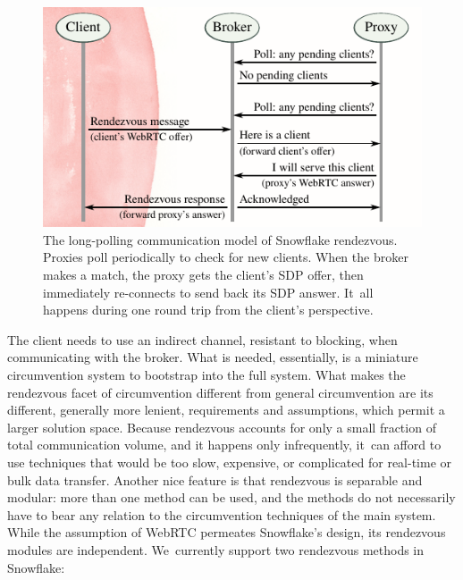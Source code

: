 \documentclass[letterpaper,twocolumn]{article}
\begin{document}
\begin{figure}
\includegraphics{figures/rendezvous/rendezvous}
\caption{
The long-polling communication model of Snowflake rendezvous.
Proxies poll periodically to check for new clients.
When the broker makes a match,
the proxy gets the client's SDP offer,
then immediately re-connects to send back its SDP answer.
It~all happens during one round trip from the client's perspective.
}
\label{fig:rendezvous}
\end{figure}

The client needs to use an indirect channel,
resistant to blocking,
when communicating with the broker.
What is needed, essentially,
is a miniature circumvention system
to bootstrap into the full system.
What makes the rendezvous facet of circumvention
different from general circumvention
are its different, generally more lenient, requirements and assumptions,
which permit a larger solution space.
Because rendezvous accounts for only a small fraction
of total communication volume,
and it happens only infrequently,
it~can afford to use techniques that would be
too slow, expensive, or complicated
for real-time or bulk data transfer.
Another nice feature is that rendezvous is separable and modular:
more than one method can be used,
and the methods do not necessarily have to bear any relation
to the circumvention techniques of the main system.
While the assumption of WebRTC permeates Snowflake's design,
its rendezvous modules are independent.
We~currently support two rendezvous methods in Snowflake:
\end{document}
